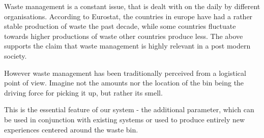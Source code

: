 Waste management is a constant issue, that is dealt with on the daily by different organisations.
According to Eurostat, the countries in europe have had a rather stable production of waste the past decade, while some countries fluctuate towards higher productions of waste other countries produce less.
The above supports the claim that waste management is highly relevant in a post modern society.

However waste management has been traditionally perceived from a logistical point of view.
Imagine not the amounts nor the location of the bin being the driving force for picking it up, but rather its smell.

This is the essential feature of our system - the additional parameter, which can be used in conjunction with existing systems or used to produce entirely new experiences centered around the waste bin.